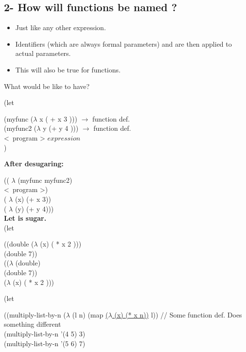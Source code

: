 \documentclass{article}
\begin{document}
\subsection*{2- How will functions be named ?}
\begin{flushleft}
\begin{itemize}
\item Just like any other expression.
\item Identifiers (which are always formal parameters) and are then applied to actual parameters.
\item This will also be true for functions.
\end{itemize}
\doublespacing
What would be like to have?

(let
   
  \hspace{0.5cm}(myfunc ($\lambda$ x ( + x 3 ))) $\rightarrow$ function def.\\ 
  \hspace{0.5cm}(myfunc2 ($\lambda$ y (+ y 4 ))) $\rightarrow$ function def.\\ 
  \hspace{0.5cm}\textless\ program \textgreater {} $expression$
\\)


\textbf{After desugaring:}

((  $\lambda$ (myfunc myfunc2)\\
\textless\ program \textgreater)\\
\hspace{0.5cm}( $\lambda$ (x) (+ x 3))\\
\hspace{0.5cm}( $\lambda$ (y) (+ y 4)))\\
\textbf{Let is sugar.}\\

(let
   
  \hspace{0.5cm}((double ($\lambda$ (x) ( * x 2 )))\\
  \hspace{0.5cm}(double 7))\\
   
(($\lambda$ (double)\\
\hspace{0.5cm}(double 7))\\
\hspace{0.5cm}($\lambda$ (x) ( * x 2 )))\\
\doublespacing

(let
   
  \hspace{0.5cm}((multiply-list-by-n ($\lambda$ (l n) (map \underline{($\lambda$ (x) (* x n))} l)) // Some function def. Does something different\\
  \hspace{1cm}(multiply-list-by-n '(4 5) 3)\\
  \hspace{1cm}(multiply-list-by-n '(5 6) 7)\\

\end{flushleft}
\end{document}
